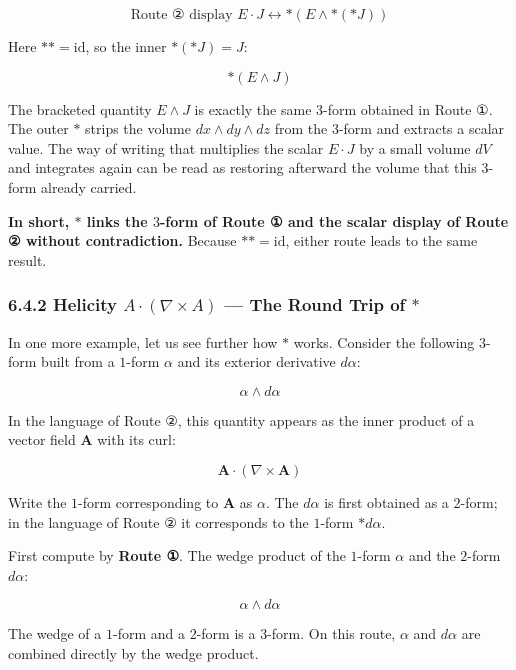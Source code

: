 \documentclass[a4paper,12pt,openany]{book}
\begin{document}
\[\text{Route ② display }E\cdot J \longleftrightarrow \ast(E \wedge \ast(\ast J))\]

Here \(\ast\ast = \mathrm{id}\), so the inner \(\ast(\ast J) = J\):

\[\ast(E \wedge J)\]

The bracketed quantity \(E \wedge J\) is exactly the same \(3\)-form
obtained in Route ①. The outer \(\ast\) strips the volume
\(dx \wedge dy \wedge dz\) from the \(3\)-form and extracts a scalar
value. The way of writing that multiplies the scalar \(E \cdot J\) by a
small volume \(dV\) and integrates again can be read as restoring
afterward the volume that this \(3\)-form already carried.

\textbf{In short, $\ast$ links the $3$-form of Route ① and the scalar display of Route ② without contradiction.}
Because \(\ast\ast = \mathrm{id}\), either route leads to the same
result.

\hypertarget{helicity-a-cdot-nabla-times-a-the-round-trip-of-ast}{%
\subsubsection{\texorpdfstring{6.4.2 Helicity
\(A \cdot (\nabla \times A)\) — The Round Trip of
\(\ast\)}{6.4.2 Helicity A \textbackslash cdot (\textbackslash nabla \textbackslash times A) — The Round Trip of \textbackslash ast}}\label{helicity-a-cdot-nabla-times-a-the-round-trip-of-ast}}

In one more example, let us see further how \(\ast\) works. Consider the
following \(3\)-form built from a \(1\)-form \(\alpha\) and its exterior
derivative \(d\alpha\):

\[\alpha \wedge d\alpha\]

In the language of Route ②, this quantity appears as the inner product
of a vector field \(\mathbf{A}\) with its curl:

\[\mathbf{A} \cdot (\nabla \times \mathbf{A})\]

Write the \(1\)-form corresponding to \(\mathbf{A}\) as \(\alpha\). The
\(d\alpha\) is first obtained as a \(2\)-form; in the language of Route
② it corresponds to the \(1\)-form \(\ast d\alpha\).

First compute by \textbf{Route ①}. The wedge product of the \(1\)-form
\(\alpha\) and the \(2\)-form \(d\alpha\):

\[\alpha \wedge d\alpha\]

The wedge of a \(1\)-form and a \(2\)-form is a \(3\)-form. On this
route, \(\alpha\) and \(d\alpha\) are combined directly by the wedge
product.
\end{document}
